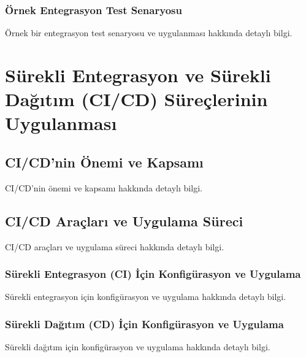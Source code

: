 \subsubsection{Örnek Entegrasyon Test Senaryosu}
Örnek bir entegrasyon test senaryosu ve uygulanması hakkında detaylı bilgi.

\section{Sürekli Entegrasyon ve Sürekli Dağıtım (CI/CD) Süreçlerinin Uygulanması}
\subsection{CI/CD'nin Önemi ve Kapsamı}
CI/CD'nin önemi ve kapsamı hakkında detaylı bilgi.

\subsection{CI/CD Araçları ve Uygulama Süreci}
CI/CD araçları ve uygulama süreci hakkında detaylı bilgi.

\subsubsection{Sürekli Entegrasyon (CI) İçin Konfigürasyon ve Uygulama}
Sürekli entegrasyon için konfigürasyon ve uygulama hakkında detaylı bilgi.

\subsubsection{Sürekli Dağıtım (CD) İçin Konfigürasyon ve Uygulama}
Sürekli dağıtım için konfigürasyon ve uygulama hakkında detaylı bilgi.
